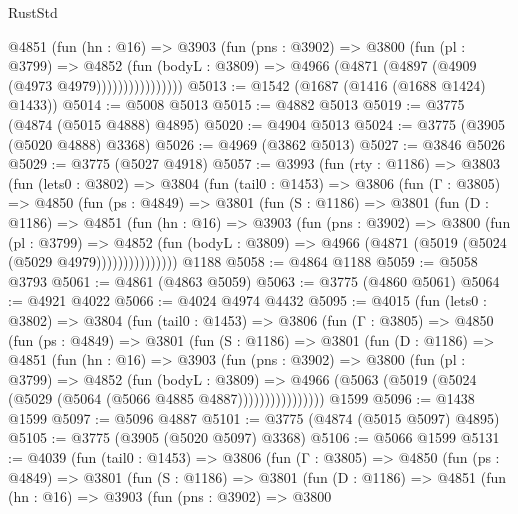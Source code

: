 \begin{lexlean}{RustStd}
\begin{coremodule}
{\begin{coremodule}
{{{{{{{{{{{{{{{{{{{{{{{{{{{{{{{                  @4851
                    (fun (hn : @16) =>
                    @3903
                      (fun (pns : @3902) =>
                      @3800
                        (fun (pl : @3799) =>
                        @4852
                          (fun (bodyL : @3809) =>
                          @4966 (@4871 (@4897 (@4909 (@4973 @4979))))))))))))))))
@5013 := @1542 (@1687 (@1416 (@1688 @1424) @1433))
@5014 := @5008 @5013
@5015 := @4882 @5013
@5019 := @3775 (@4874 (@5015 @4888) @4895)
@5020 := @4904 @5013
@5024 := @3775 (@3905 (@5020 @4888) @3368)
@5026 := @4969 (@3862 @5013)
@5027 := @3846 @5026
@5029 := @3775 (@5027 @4918)
@5057 := @3993
    (fun (rty : @1186) =>
    @3803
      (fun (lets0 : @3802) =>
      @3804
        (fun (tail0 : @1453) =>
        @3806
          (fun (Γ : @3805) =>
          @4850
            (fun (ps : @4849) =>
            @3801
              (fun (S : @1186) =>
              @3801
                (fun (D : @1186) =>
                @4851
                  (fun (hn : @16) =>
                  @3903
                    (fun (pns : @3902) =>
                    @3800
                      (fun (pl : @3799) =>
                      @4852
                        (fun (bodyL : @3809) =>
                        @4966 (@4871 (@5019 (@5024 (@5029 @4979)))))))))))))))
    @1188
@5058 := @4864 @1188
@5059 := @5058 @3793
@5061 := @4861 (@4863 @5059)
@5063 := @3775 (@4860 @5061)
@5064 := @4921 @4022
@5066 := @4024 @4974 @4432
@5095 := @4015
    (fun (lets0 : @3802) =>
    @3804
      (fun (tail0 : @1453) =>
      @3806
        (fun (Γ : @3805) =>
        @4850
          (fun (ps : @4849) =>
          @3801
            (fun (S : @1186) =>
            @3801
              (fun (D : @1186) =>
              @4851
                (fun (hn : @16) =>
                @3903
                  (fun (pns : @3902) =>
                  @3800
                    (fun (pl : @3799) =>
                    @4852
                      (fun (bodyL : @3809) =>
                      @4966 (@5063 (@5019 (@5024 (@5029 (@5064 (@5066 @4885 @4887))))))))))))))))
    @1599
@5096 := @1438 @1599
@5097 := @5096 @4887
@5101 := @3775 (@4874 (@5015 @5097) @4895)
@5105 := @3775 (@3905 (@5020 @5097) @3368)
@5106 := @5066 @1599
@5131 := @4039
    (fun (tail0 : @1453) =>
    @3806
      (fun (Γ : @3805) =>
      @4850
        (fun (ps : @4849) =>
        @3801
          (fun (S : @1186) =>
          @3801
            (fun (D : @1186) =>
            @4851
              (fun (hn : @16) =>
              @3903
                (fun (pns : @3902) =>
                @3800
}}}}}}}}}}}}}}}}}}}}}}}}}}}}}}}
\end{coremodule}}
\end{coremodule}
\end{lexlean}
